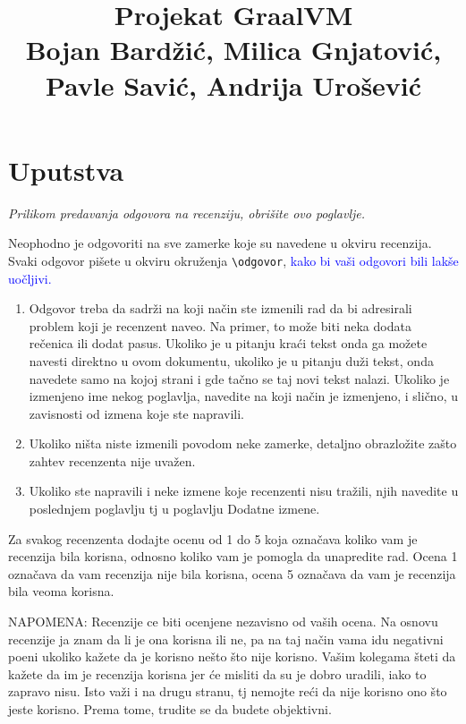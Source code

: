 \documentclass[a4paper]{report}
\newcommand{\odgovor}[1]{\textcolor{blue}{#1}}
\begin{document}
\title{Projekat GraalVM\\ \small{Bojan Bardžić, Milica Gnjatović, Pavle Savić, Andrija Urošević}}

\maketitle

\tableofcontents

\chapter{Uputstva}
\emph{Prilikom predavanja odgovora na recenziju, obrišite ovo poglavlje.}

Neophodno je odgovoriti na sve zamerke koje su navedene u okviru recenzija. Svaki odgovor pišete u okviru okruženja \verb"\odgovor", \odgovor{kako bi vaši odgovori bili lakše uočljivi.} 
\begin{enumerate}

\item Odgovor treba da sadrži na koji način ste izmenili rad da bi adresirali problem koji je recenzent naveo. Na primer, to može biti neka dodata rečenica ili dodat pasus. Ukoliko je u pitanju kraći tekst onda ga možete navesti direktno u ovom dokumentu, ukoliko je u pitanju duži tekst, onda navedete samo na kojoj strani i gde tačno se taj novi tekst nalazi. Ukoliko je izmenjeno ime nekog poglavlja, navedite na koji način je izmenjeno, i slično, u zavisnosti od izmena koje ste napravili. 

\item Ukoliko ništa niste izmenili povodom neke zamerke, detaljno obrazložite zašto zahtev recenzenta nije uvažen.

\item Ukoliko ste napravili i neke izmene koje recenzenti nisu tražili, njih navedite u poslednjem poglavlju tj u poglavlju Dodatne izmene.
\end{enumerate}

Za svakog recenzenta dodajte ocenu od 1 do 5 koja označava koliko vam je recenzija bila korisna, odnosno koliko vam je pomogla da unapredite rad. Ocena 1 označava da vam recenzija nije bila korisna, ocena 5 označava da vam je recenzija bila veoma korisna. 

NAPOMENA: Recenzije ce biti ocenjene nezavisno od vaših ocena. Na osnovu recenzije ja znam da li je ona korisna ili ne, pa na taj način vama idu negativni poeni ukoliko kažete da je korisno nešto što nije korisno. Vašim kolegama šteti da kažete da im je recenzija korisna jer će misliti da su je dobro uradili, iako to zapravo nisu. Isto važi i na drugu stranu, tj nemojte reći da nije korisno ono što jeste korisno. Prema tome, trudite se da budete objektivni. 
\end{document}
